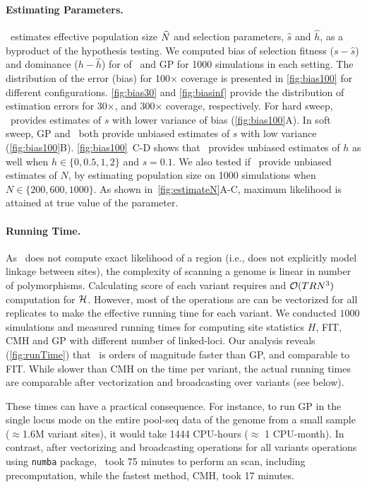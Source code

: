 \paragraph{Estimating Parameters.}
\comale\ estimates effective population size $\widehat{N}$  and selection parameters, 
$\hat{s}$ and $\hat{h}$, as
a byproduct of the hypothesis testing. We computed bias of selection
fitness ($s-\hat{s}$) and dominance ($h-\hat{h}$) for of \comale\
and GP for 1000 simulations in each setting. The distribution of the error 
(bias) for
100$\times$ coverage is presented in \ref{fig:bias100} for
different configurations.
\ref{fig:bias30} and \ref{fig:biasinf} provide the
distribution of estimation errors for 30$\times$, and 300$\times$
coverage, respectively.  For hard sweep, \comale\ provides estimates
of $s$ with lower variance of bias (\ref{fig:bias100}A). In soft
sweep, GP and \comale\ both provide unbiased estimates of $s$ with low
variance (\ref{fig:bias100}B). \ref{fig:bias100}~C-D shows
that \comale\ provides unbiased estimates of $h$ as well when 
$h\in\{0,0.5,1,2\}$ and $s=0.1$.
We also tested if \comale\ provide unbiased estimates of $N$, by estimating 
population size on 1000 simulations when $N\in \{200,600,1000\}$. As 
shown in~\ref{fig:estimateN}A-C, maximum likelihood is attained at true value 
of the parameter.

\paragraph{Running Time.}
As \comale\ does not compute exact likelihood of a region (i.e., does
not explicitly model linkage between sites), the complexity of
scanning a genome is linear in number of polymorphisms.  Calculating
score of each variant requires and ${\cal O}(TRN^3)$ computation
for ${\cal H}$. However, most of the operations
are can be vectorized for all replicates to make the effective running
time for each variant.  We
conducted $1000$ simulations and measured running times for computing site 
statistics $H$, FIT, CMH and GP with different number of linked-loci.  Our
analysis reveals (\ref{fig:runTime}) that \comale\ is orders of
magnitude faster than GP, and comparable to FIT. While slower than CMH
on the time per variant, the actual running times are comparable after
vectorization and broadcasting over variants (see below).

These times can have a practical consequence. For instance, to run GP
in the single locus mode on the entire pool-seq data of the \dmel genome from a
small sample ($\approx$1.6M variant sites), it would take 1444 CPU-hours
($\approx$ 1 CPU-month). In contrast, after vectorizing and
broadcasting operations for all variants operations using
\texttt{numba} package, \comale\ took 75 minutes to perform an
scan, including precomputation, while the fastest method, CMH, took 17 minutes.

